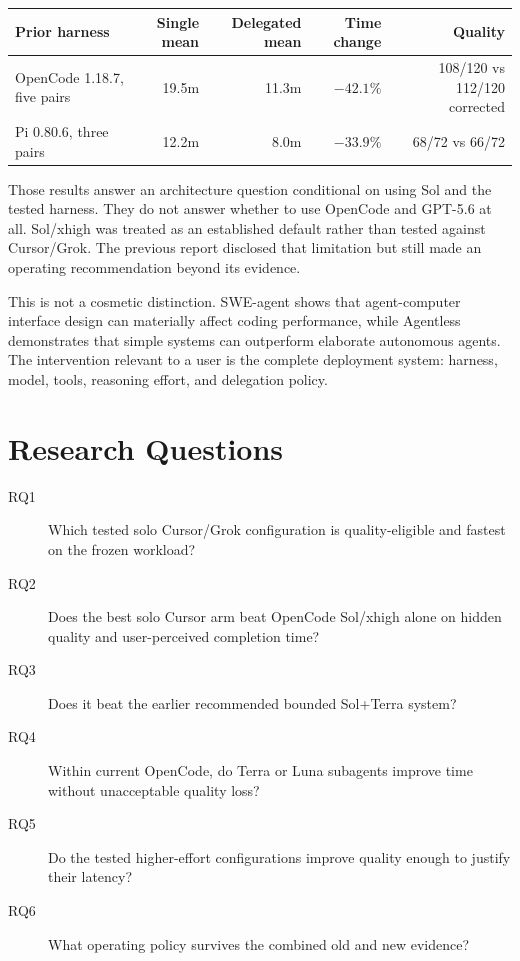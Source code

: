 \documentclass[11pt,oneside]{article}
\begin{document}
\begin{center}
\begin{tabularx}{\textwidth}{@{}Xrrrr@{}}
\toprule
Prior harness & Single mean & Delegated mean & Time change & Quality \\
\midrule
OpenCode 1.18.7, five pairs & 19.5m & 11.3m & $-42.1\%$ & 108/120 vs 112/120 corrected \\
Pi 0.80.6, three pairs & 12.2m & 8.0m & $-33.9\%$ & 68/72 vs 66/72 \\
\bottomrule
\end{tabularx}
\end{center}

Those results answer an architecture question conditional on using Sol and the
tested harness. They do not answer whether to use OpenCode and GPT-5.6 at all.
Sol/xhigh was treated as an established default rather than tested against
Cursor/Grok. The previous report disclosed that limitation but still made an
operating recommendation beyond its evidence.

This is not a cosmetic distinction. SWE-agent shows that agent-computer
interface design can materially affect coding performance, while Agentless
demonstrates that simple systems can outperform elaborate autonomous agents.
The intervention relevant to a user is the complete deployment system: harness,
model, tools, reasoning effort, and delegation policy.

\section{Research Questions}

\begin{description}
  \item[RQ1] Which tested solo Cursor/Grok configuration is quality-eligible
  and fastest on the frozen workload?
  \item[RQ2] Does the best solo Cursor arm beat OpenCode Sol/xhigh alone on
  hidden quality and user-perceived completion time?
  \item[RQ3] Does it beat the earlier recommended bounded Sol+Terra system?
  \item[RQ4] Within current OpenCode, do Terra or Luna subagents improve time
  without unacceptable quality loss?
  \item[RQ5] Do the tested higher-effort configurations improve quality enough
  to justify their latency?
  \item[RQ6] What operating policy survives the combined old and new evidence?
\end{description}
\end{document}
